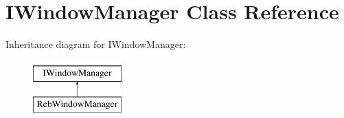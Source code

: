 \hypertarget{class_i_window_manager}{}\section{I\+Window\+Manager Class Reference}
\label{class_i_window_manager}
Inheritance diagram for I\+Window\+Manager\+:\begin{figure}[H]
\begin{center}
\leavevmode
\includegraphics[height=2.000000cm]{class_i_window_manager}
\end{center}
\end{figure}
